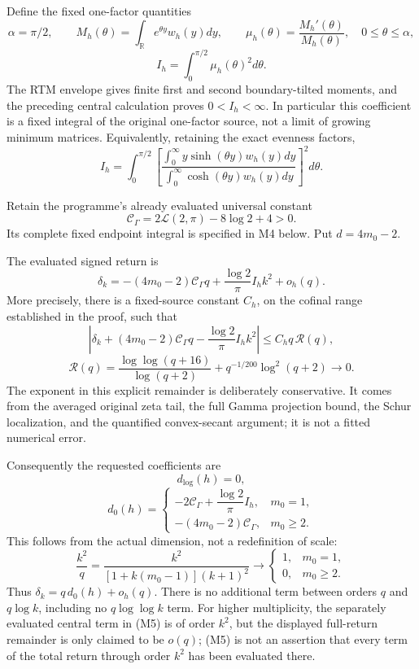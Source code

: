\documentclass[11pt,a4paper]{article}
\begin{document}
Define the fixed one-factor quantities \[
\alpha=\pi/2,\qquad M_h(\theta)=\int_{\mathbb R}e^{\theta y}w_h(y)dy,
\qquad \mu_h(\theta)=\frac{M_h'(\theta)}{M_h(\theta)},
\quad0\le\theta\le\alpha,
\] \[
\boxed{I_h=\int_0^{\pi/2}\mu_h(\theta)^2d\theta.}\tag{M2}
\] The RTM envelope gives finite first and second boundary-tilted
moments, and the preceding central calculation proves \(0<I_h<\infty\).
In particular this coefficient is a fixed integral of the original
one-factor source, not a limit of growing minimum matrices.
Equivalently, retaining the exact evenness factors, \[
I_h=\int_0^{\pi/2}
\left[
\frac{\int_0^\infty y\sinh(\theta y)w_h(y)dy}
{\int_0^\infty \cosh(\theta y)w_h(y)dy}
\right]^2d\theta.
\tag{M3}
\]

Retain the programme's already evaluated universal constant \[
\boxed{\mathcal C_\Gamma=2\mathcal L(2,\pi)-8\log2+4>0.}\tag{M4}
\] Its complete fixed endpoint integral is specified in M4 below. Put
\(d=4m_0-2\).

The evaluated signed return is \[
\boxed{\delta_k
=-(4m_0-2)\mathcal C_\Gamma q
+\frac{\log2}{\pi}I_h k^2+o_h(q).}\tag{M5}
\] More precisely, there is a fixed-source constant \(C_h\), on the
cofinal range established in the proof, such that \[
\boxed{
\left|\delta_k+(4m_0-2)\mathcal C_\Gamma q
-\frac{\log2}{\pi}I_h k^2\right|
\le C_hq\,\mathscr R(q),
}\tag{M6}
\] \[
\mathscr R(q)=
\frac{\log\log(q+16)}{\log(q+2)}
+q^{-1/200}\log^2(q+2)
\longrightarrow0.
\] The exponent in this explicit remainder is deliberately conservative.
It comes from the averaged original zeta tail, the full Gamma projection
bound, the Schur localization, and the quantified convex-secant
argument; it is not a fitted numerical error.

Consequently the requested coefficients are \[
\boxed{d_{\log}(h)=0,}\tag{M7}
\] \[
\boxed{
 d_0(h)=
 \begin{cases}
 -2\mathcal C_\Gamma+\dfrac{\log2}{\pi}I_h,&m_0=1,\\[5pt]
 -(4m_0-2)\mathcal C_\Gamma,&m_0\ge2.
 \end{cases}}
\tag{M8}
\] This follows from the actual dimension, not a redefinition of scale:
\[
\frac{k^2}{q}=
\frac{k^2}{[1+k(m_0-1)](k+1)^2}
\longrightarrow
\begin{cases}1,&m_0=1,\\0,&m_0\ge2.\end{cases}
\] Thus \(\delta_k=q\,d_0(h)+o_h(q)\). There is no additional term
between orders \(q\) and \(q\log k\), including no \(q\log\log k\) term.
For higher multiplicity, the separately evaluated central term in (M5)
is of order \(k^2\), but the displayed full-return remainder is only
claimed to be \(o(q)\); (M5) is not an assertion that every term of the
total return through order \(k^2\) has been evaluated there.
\end{document}
